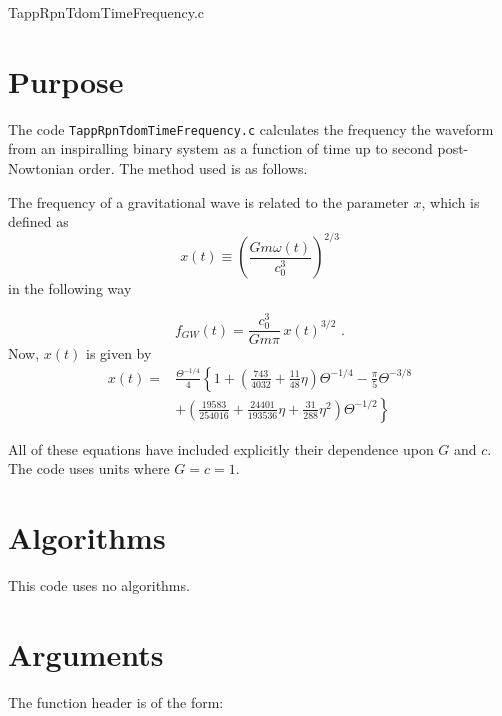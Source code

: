 \documentclass[12pt]{article}
\begin{document}
\huge
\begin{center}
TappRpnTdomTimeFrequency.c
\end{center}
\normalsize
\vspace{10mm}

\section{Purpose}

The code \texttt{TappRpnTdomTimeFrequency.c} calculates the frequency the waveform from an inspiralling binary system as a function of time up to second post-Nowtonian order. The method used is as follows.


The frequency of a gravitational wave is related to the parameter $x$, which is defined as 
\begin{equation}
x(t) \equiv \left( \frac{Gm \omega(t)}{c^{3}_{0}} \right)^{2/3}
\end{equation}
in the following way

\begin{equation}
f_{GW}(t) = \frac{c^{3}_{0}}{G m \pi} \, x(t)^{3/2} \,\,.
\label{fofx}
\end{equation}
Now, $x(t)$ is given by
\begin{equation}
\begin{split}
x(t) =  &  \frac{\Theta^{-1/4}}{4} \left\{  1 + \left(\frac{743}{4032} + \frac{11}{48} \eta \right) \Theta^{-1/4} - \frac{\pi}{5} \Theta^{-3/8} \right. \\
     &  + \left. \left( \frac{19583}{254016} + \frac{24401}{193536} \eta + \frac{31}{288} \eta^{2} \right) \Theta^{-1/2} \right\}
\end{split}
\label{xoft}
\end{equation}

All of these equations have included explicitly their dependence upon $G$ and $c$. The code uses units where $G=c=1$.



\section{Algorithms}

This code uses no algorithms.


\section{Arguments}

The function header is of the form:
\end{document}
